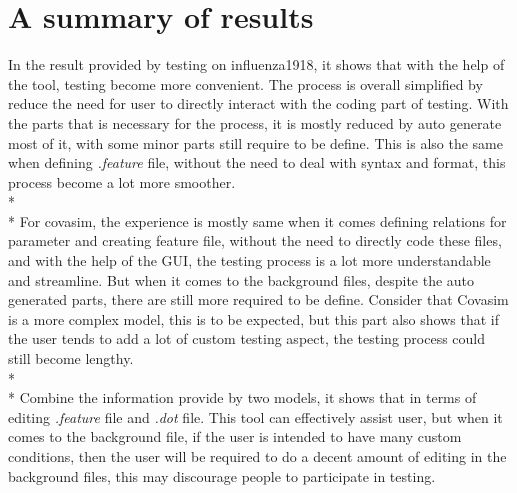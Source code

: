 \section{A summary of results}
In the result provided by testing on influenza1918, it shows that with the help of the tool, testing become more convenient. The process is overall simplified by reduce the need for user to directly interact with the coding part of testing. With the parts that is necessary for the process, it is mostly reduced by auto generate most of it, with some minor parts still require to be define. This is also the same when defining \textsl{.feature} file, without the need to deal with syntax and format, this process become a lot more smoother. \\*\\*
For covasim, the experience is mostly same when it comes defining relations for parameter and creating feature file, without the need to directly code these files, and with the help of the GUI, the testing process is a lot more understandable and streamline. But when it comes to the background files, despite the auto generated parts, there are still more required to be define. Consider that Covasim is a more complex model, this is to be expected, but this part also shows that if the user tends to add a lot of custom testing aspect, the testing process could still become lengthy.\\*\\*
Combine the information provide by two models, it shows that in terms of editing \textsl{.feature} file and \textsl{.dot} file. This tool can effectively assist user, but when it comes to the background file, if the user is intended to have many custom conditions, then the user will be required to do a decent amount of editing in the background files, this may discourage people to participate in testing.
